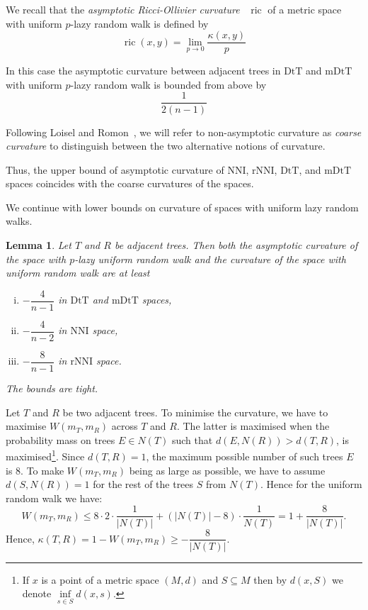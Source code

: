 \documentclass{amsart}
\newtheorem{lemma}{Lemma}
\newcommand{\dts}{\mathrm{DtT}}
\newcommand{\nni}{\mathrm{NNI}}
\newcommand{\rnni}{\mathrm{rNNI}}
\newcommand{\mdts}{\mathrm{mDtT}}
\newcommand{\ric}{\operatorname{ric}}
\begin{document}
We recall that the {\em asymptotic Ricci-Ollivier curvature}~\cite{Loisel2014-gu} $\ric$ of a metric space with uniform $p$-lazy random walk is defined by
\[
\ric(x,y) = \lim_{p\to0} \frac{\kappa(x,y)}{p}
\]

In this case the asymptotic curvature between adjacent trees in $\dts$ and $\mdts$ with uniform $p$-lazy random walk is bounded from above by
\[
\frac{1}{2(n-1)}
\]

Following Loisel and Romon~\cite{Loisel2014-gu}, we will refer to non-asymptotic curvature as {\em coarse curvature} to distinguish between the two alternative notions of curvature.


Thus, the upper bound of asymptotic curvature of $\nni$, $\rnni$, $\dts$, and $\mdts$ spaces coincides with the coarse curvatures of the spaces.

We continue with lower bounds on curvature of spaces with uniform lazy random walks.

\begin{lemma}\label{uniformLower}
Let $T$ and $R$ be adjacent trees.
Then both the asymptotic curvature of the space with $p$-lazy uniform random walk and the curvature of the space with uniform random walk are at least 
\begin{enumerate}[(i)]
\item $-\dfrac{4}{n-1}$ in $\dts$ and $\mdts$ spaces,
\item $-\dfrac{4}{n-2}$ in $\nni$ space,
\item $-\dfrac{8}{n-1}$ in $\rnni$ space.
\end{enumerate}

The bounds are tight.
\end{lemma}

\proof
Let $T$ and $R$ be two adjacent trees.
To minimise the curvature, we have to maximise $W(m_T, m_R)$ across $T$ and $R$.
The latter is maximised when the probability mass on trees $E\in N(T)$ such that $d(E, N(R)) > d(T, R)$, is
maximised\footnote{If $x$ is a point of a metric space $(M,d)$ and $S \subseteq M$ then by $d(x,S)$ we denote $\inf\limits_{s \in S} d(x,s)$.}.
Since $d(T, R) = 1$, the maximum possible number of such trees $E$ is
$8$.
To make $W(m_T,m_R)$ being as large as possible, we have to assume $d(S, N(R)) = 1$ for the rest of the trees $S$ from $N(T)$.
Hence for the uniform random walk we have:
\[
W(m_T,m_R)\leq 8 \cdot 2 \cdot \frac{1}{|N(T)|} +
(|N(T)| - 8) \cdot \frac{1}{N(T)} = 1 + \dfrac{8}{|N(T)|}.
\]
Hence, $\kappa(T,R) = 1 - W(m_T,m_R) \geq - \dfrac{8}{|N(T)|}$.
\end{document}
